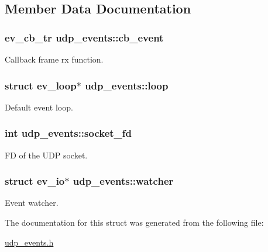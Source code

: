 \subsection{\-Member \-Data \-Documentation}
\hypertarget{structudp__events_af1d93273b21147bc474129eaed1a4c2b}{
\subsubsection[{cb\-\_\-event}]{\setlength{\rightskip}{0pt plus 5cm}ev\-\_\-cb\-\_\-tr {\bf udp\-\_\-events\-::cb\-\_\-event}}}\label{structudp__events_af1d93273b21147bc474129eaed1a4c2b}
\-Callback frame rx function. \hypertarget{structudp__events_a5f6feacee2f88e4b88dac97c35ac7ecf}{
\subsubsection[{loop}]{\setlength{\rightskip}{0pt plus 5cm}struct ev\-\_\-loop$\ast$ {\bf udp\-\_\-events\-::loop}}}\label{structudp__events_a5f6feacee2f88e4b88dac97c35ac7ecf}
\-Default event loop. \hypertarget{structudp__events_a00ffd8627929bc97337b12bbde552a3c}{
\subsubsection[{socket\-\_\-fd}]{\setlength{\rightskip}{0pt plus 5cm}int {\bf udp\-\_\-events\-::socket\-\_\-fd}}}\label{structudp__events_a00ffd8627929bc97337b12bbde552a3c}
\-F\-D of the \-U\-D\-P socket. \hypertarget{structudp__events_a8d254ac5c405901ecb300d0abc604bd8}{
\subsubsection[{watcher}]{\setlength{\rightskip}{0pt plus 5cm}struct ev\-\_\-io$\ast$ {\bf udp\-\_\-events\-::watcher}}}\label{structudp__events_a8d254ac5c405901ecb300d0abc604bd8}
\-Event watcher. 

\-The documentation for this struct was generated from the following file\-:\begin{DoxyCompactItemize}
\item 
\hyperlink{udp__events_8h}{udp\-\_\-events.\-h}\end{DoxyCompactItemize}
